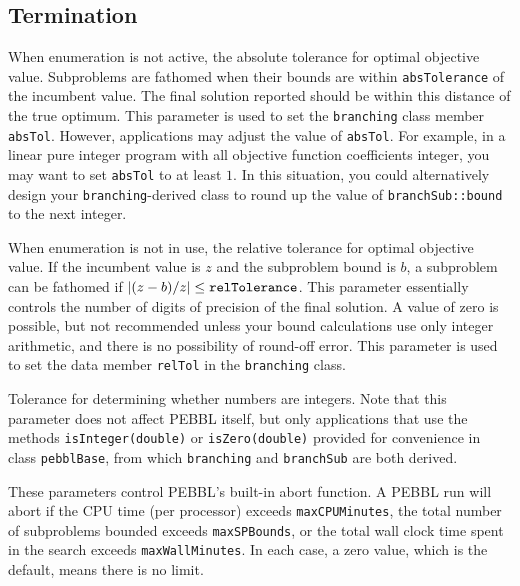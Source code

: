 \subsection{Termination}
\vspace{-3ex} 
When enumeration is not active, the absolute
tolerance for optimal objective value.
Subproblems are fathomed when
their bounds are within \texttt{absTolerance} of the incumbent value.
The final solution reported should be within this distance of the true
optimum.  This parameter is used to set the \texttt{branching} class
member \texttt{absTol}.  However, applications may adjust the value
of \texttt{absTol}.  For example, in a linear pure integer program
with all objective function coefficients integer, you may want to set
\texttt{absTol} to at least $1$.  In this situation, you could
alternatively design your \texttt{branching}-derived class to round up
the value of \texttt{branchSub::bound} to the next integer.

When enumeration is not in use, the 
relative tolerance for optimal objective value.  If the incumbent
value is $z$ and the subproblem bound is $b$, a subproblem can be
fathomed if ${\left|(z - b)/z\right|} \leq
\text{\texttt{relTolerance}}$.  This parameter essentially controls the
number of digits of precision of the final solution.  A
value of zero is possible, but not recommended unless your bound
calculations use only integer arithmetic, and there is no possibility
of round-off error.  This parameter is used to set the data member
\texttt{relTol} in the \texttt{branching} class.

Tolerance for determining whether numbers are integers.  Note that
this parameter does not affect PEBBL itself, but only applications that
use the methods \texttt{isInteger(double)} or
\texttt{isZero(double)} provided for convenience in class
\texttt{pebblBase}, from which \texttt{branching} and
\texttt{branchSub} are both derived.

\groupparams
{}
\groupparams
{}
These parameters control PEBBL's built-in abort function.  A PEBBL run
will abort if the CPU time (per processor) exceeds
\texttt{maxCPUMinutes}, the total number of subproblems bounded
exceeds \texttt{maxSPBounds}, or the total wall clock time spent in
the search exceeds \texttt{maxWallMinutes}.  In each case, a zero
value, which is the default, means there is no limit.

